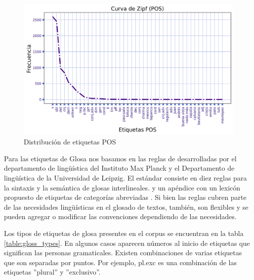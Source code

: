 \documentclass[letterpaper,12pt,oneside]{book}
\newcommand{\note}[4][]{\todo[author=#2,color=#3,size=\scriptsize,fancyline,caption={},#1]{#4}} %
\newcommand{\vic}[2][]{\note[#1]{Vic}{orange!40}{#2}}
\newcommand{\Vic}[2][]{\vic[inline,#1]{#2}\noindent}
\theoremstyle{definition}
\begin{document}
\begin{figure}
	\centering
	\includegraphics[width=\textwidth]{zipf_pos}
	\caption{Distribución de etiquetas POS}%
	\label{fig:pos_distrib}
\end{figure}

Para las etiquetas de Glosa nos basamos en las reglas de \citet{comrie2008leipzig} desarrolladas por el departamento de lingüística del Instituto Max Planck y el Departamento de lingüística de la Universidad de Leipzig. El estándar consiste en diez reglas para la sintaxis y la semántica de glosas interlineales. y un apéndice con un lexicón propuesto de etiquetas de categorías abreviadas \citep{comrie2008leipzig}. Si bien las reglas cubren parte de las necesidades lingüísticas en el glosado de textos, también, son flexibles y se pueden agregar o modificar las convenciones dependiendo de las necesidades.

Los tipos de etiquetas de glosa presentes en el corpus se encuentran en la tabla \ref{table:gloss_types}. En algunos casos aparecen números al inicio de etiquetas que significan las personas gramaticales. Existen combinaciones de varias etiquetas que son separadas por puntos. Por ejemplo, \textsf{pl.exc} es una combinación de las etiquetas ''plural'' y ''exclusivo''.
\end{document}
